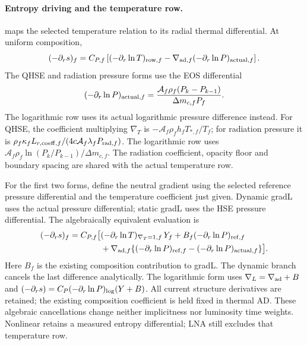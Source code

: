 \documentclass[11pt]{article}
\newcommand{\code}[1]{\texttt{\detokenize{#1}}}
\begin{document}
\paragraph{Entropy driving and the temperature row.}
\code{get_rsp2_thermal_gradient} maps the selected temperature relation to
its radial thermal differential. At uniform composition,
\begin{equation}
 (-\partial_r s)_f=C_{P,f}\left[
    (-\partial_r\ln T)_{{\rm row},f}
       -\nabla_{{\rm ad},f}(-\partial_r\ln P)_{{\rm actual},f}\right].
\end{equation}
The QHSE and radiation pressure forms use the EOS differential
\begin{equation}
 (-\partial_r\ln P)_{{\rm actual},f}
 =\frac{\mathcal A_f\rho_f(P_k-P_{k-1})}{\Delta m_{c,f}P_f}.
\end{equation}
The logarithmic row uses its actual logarithmic pressure difference instead.
For QHSE, the coefficient multiplying $\nabla_T$ is
$-\mathcal A_f\rho_f h_fT_{*,f}/T_f$; for radiation pressure it is
$\rho_f\kappa_fL_{r,\mathrm{coeff},f}/
(4c\mathcal A_f\lambda_fP_{{\rm rad},f})$.
The logarithmic row uses
$\mathcal A_f\rho_f\ln(P_k/P_{k-1})/\Delta m_{c,f}$.
The radiation coefficient, opacity floor and boundary spacing are shared
with the actual temperature row.

For the first two forms, define the neutral gradient using the selected
reference pressure differential and the temperature coefficient just given.
Dynamic gradL uses the actual pressure differential; static gradL uses the
HSE pressure differential. The algebraically equivalent evaluation is
\begin{equation}
\begin{aligned}
 (-\partial_r s)_f=C_{P,f}\big[&
 (-\partial_r\ln T)_{\nabla_T=1,f}\,Y_f
 +B_f(-\partial_r\ln P)_{{\rm ref},f}\\
 &+\nabla_{{\rm ad},f}\{
 (-\partial_r\ln P)_{{\rm ref},f}
 -(-\partial_r\ln P)_{{\rm actual},f}\}\big].
\end{aligned}
\end{equation}
Here $B_f$ is the existing composition contribution to gradL. The dynamic
branch cancels the last difference analytically. The logarithmic form uses
$\nabla_L=\nabla_{\rm ad}+B$ and
$(-\partial_r s)=C_P(-\partial_r\ln P)_{\rm log}(Y+B)$.
All current structure derivatives are retained; the existing composition
coefficient is held fixed in thermal AD. These algebraic cancellations
change neither implicitness nor luminosity time weights. Nonlinear
\code{constant_L} retains a measured entropy differential; LNA still excludes
that temperature row.
\end{document}
